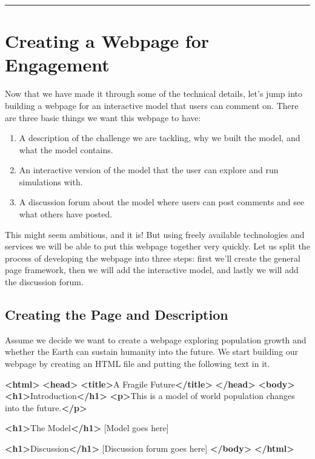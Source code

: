 \documentclass[]{memoir}
\newenvironment{Shaded}{}{}
\newcommand{\KeywordTok}[1]{\textcolor[rgb]{0.00,0.44,0.13}{\textbf{{#1}}}}
\newcommand{\NormalTok}[1]{{#1}}
\begin{document}
\begin{center}\rule{3in}{0.4pt}\end{center}

\section{Creating a Webpage for Engagement}

Now that we have made it through some of the technical details, let's
jump into building a webpage for an interactive model that users can
comment on. There are three basic things we want this webpage to have:

\begin{enumerate}
\def\labelenumi{\arabic{enumi}.}
\itemsep1pt\parskip0pt
\item
  A description of the challenge we are tackling, why we built the
  model, and what the model contains.
\item
  An interactive version of the model that the user can explore and run
  simulations with.
\item
  A discussion forum about the model where users can post comments and
  see what others have posted.
\end{enumerate}

This might seem ambitious, and it is! But using freely available
technologies and services we will be able to put this webpage together
very quickly. Let us split the process of developing the webpage into
three steps: first we'll create the general page framework, then we will
add the interactive model, and lastly we will add the discussion forum.

\subsection{Creating the Page and Description}

Assume we decide we want to create a webpage exploring population growth
and whether the Earth can sustain humanity into the future. We start
building our webpage by creating an HTML file and putting the following
text in it.

\begin{Shaded}
\begin{Highlighting}[]
\KeywordTok{<html>}
\KeywordTok{<head>}
    \KeywordTok{<title>}\NormalTok{A Fragile Future}\KeywordTok{</title>}
\KeywordTok{</head>}
\KeywordTok{<body>}
    \KeywordTok{<h1>}\NormalTok{Introduction}\KeywordTok{</h1>}
        \KeywordTok{<p>}\NormalTok{This is a model of world population}
            \NormalTok{changes into the future.}\KeywordTok{</p>}
            
    \KeywordTok{<h1>}\NormalTok{The Model}\KeywordTok{</h1>}
        \NormalTok{[Model goes here]}
        
    \KeywordTok{<h1>}\NormalTok{Discussion}\KeywordTok{</h1>}
        \NormalTok{[Discussion forum goes here]}
\KeywordTok{</body>}
\KeywordTok{</html>}
\end{Highlighting}
\end{Shaded}
\end{document}
